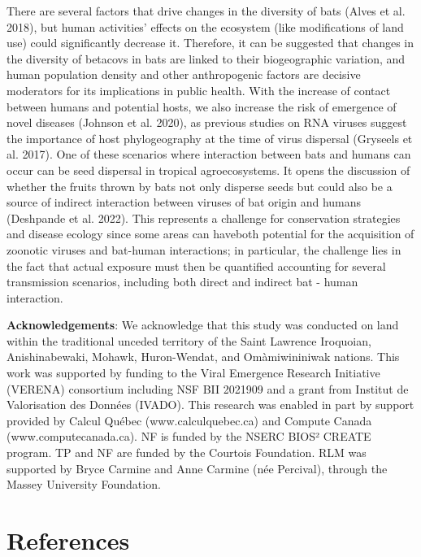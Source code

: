 \documentclass[11pt]{article}
\begin{document}
There are several factors that drive changes in the diversity of bats
(Alves et al. 2018), but human activities' effects on the ecosystem
(like modifications of land use) could significantly decrease it.
Therefore, it can be suggested that changes in the diversity of betacovs
in bats are linked to their biogeographic variation, and human
population density and other anthropogenic factors are decisive
moderators for its implications in public health. With the increase of
contact between humans and potential hosts, we also increase the risk of
emergence of novel diseases (Johnson et al. 2020), as previous studies
on RNA viruses suggest the importance of host phylogeography at the time
of virus dispersal (Gryseels et al. 2017). One of these scenarios where
interaction between bats and humans can occur can be seed dispersal in
tropical agroecosystems. It opens the discussion of whether the fruits
thrown by bats not only disperse seeds but could also be a source of
indirect interaction between viruses of bat origin and humans (Deshpande
et al. 2022). This represents a challenge for conservation strategies
and disease ecology since some areas can haveboth potential for the
acquisition of zoonotic viruses and bat-human interactions; in
particular, the challenge lies in the fact that actual exposure must
then be quantified accounting for several transmission scenarios,
including both direct and indirect bat - human interaction.

\textbf{Acknowledgements}: We acknowledge that this study was conducted
on land within the traditional unceded territory of the Saint Lawrence
Iroquoian, Anishinabewaki, Mohawk, Huron-Wendat, and Omàmiwininiwak
nations. This work was supported by funding to the Viral Emergence
Research Initiative (VERENA) consortium including NSF BII 2021909 and a
grant from Institut de Valorisation des Données (IVADO). This research
was enabled in part by support provided by Calcul Québec
(www.calculquebec.ca) and Compute Canada (www.computecanada.ca). NF is
funded by the NSERC BIOS² CREATE program. TP and NF are funded by the
Courtois Foundation. RLM was supported by Bryce Carmine and Anne Carmine
(née Percival), through the Massey University Foundation.

\hypertarget{references}{%
\section*{References}\label{references}}
\end{document}
